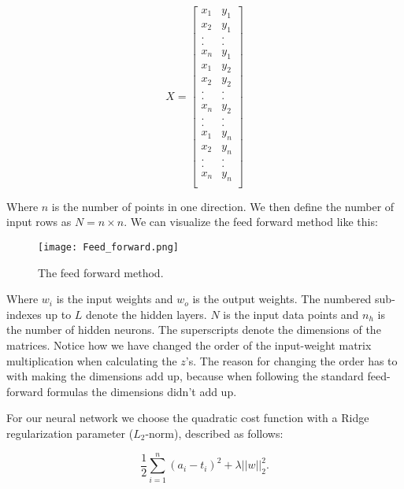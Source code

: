 \documentclass[a4paper, UKenglish, 11pt]{uiomaster}
\begin{document}
\begin{equation}
X=
    \begin{bmatrix}
        x_1 & y_1\\
        x_2 & y_1 \\
        . & . \\
        . & . \\
        x_n & y_1 \\
        x_1 & y_2 \\
        x_2 & y_2 \\
        . & . \\
        . & . \\
        x_n & y_2 \\
        . & . \\
        . & . \\
        x_1 & y_n \\
        x_2 & y_n \\
        . & . \\
        . & . \\
        x_n & y_n \\
    \end{bmatrix}
\label{eq:design}
\end{equation}

Where $n$ is the number of points in one direction. We then define the number of input rows as $N=n\times n$. We can visualize the feed forward method like this:

\begin{figure}[H]
    \centering
    \texttt{[image: Feed\_forward.png]}
    \caption{The feed forward method.}
    \label{fig:our_FFNN}
\end{figure}

Where $w_i$ is the input weights and $w_o$ is the output weights. The numbered sub-indexes up to $L$ denote the hidden layers. $N$ is the input data points and $n_h$ is the number of hidden neurons. The superscripts denote the dimensions of the matrices. Notice how we have changed the order of the input-weight matrix multiplication when calculating the $z$'s. The reason for changing the order has to with making the dimensions add up, because when following the standard feed-forward formulas the dimensions didn't add up.

For our neural network we choose the quadratic cost function with a Ridge regularization parameter ($L_2$-norm), described as follows:

\begin{equation}
    \frac{1}{2}\sum_{i=1}^{n}(a_i - t_i)^2 + \lambda||w||_2^2.
\end{equation}
\end{document}
